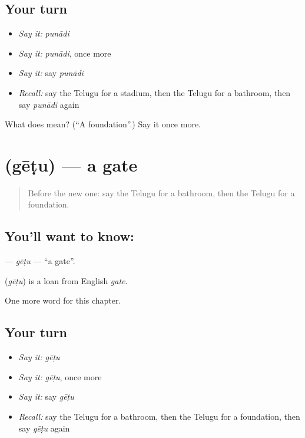 \subsection*{Your turn}
\begin{itemize}
\raggedright
  \item \emph{Say it:} \emph{punādi}
  \item \emph{Say it:} \emph{punādi}, once more
  \item \emph{Say it:} say \emph{punādi}
  \item \emph{Recall:} say the Telugu for a stadium, then the Telugu for a bathroom, then say \emph{punādi} again
\end{itemize}

\begin{tcolorbox}[breakable,colback=teal!4,colframe=teal!35!black,title={Before you move on}]
What does  mean? (\textquotedblleft{}A foundation\textquotedblright{}.) Say it once more.
\end{tcolorbox}
\section[\texorpdfstring{\te{గేటు} (gēṭu)}{గేటు (gēṭu)}]{ (gēṭu) — a gate}

\label{lesson:TE-C216-getu}



\begin{quote}
Before the new one: say the Telugu for a bathroom, then the Telugu for a foundation.
\end{quote}

\subsection*{You'll want to know: }
\textbf{} — \emph{gēṭu} — \textquotedblleft{}a gate\textquotedblright{}.

\begin{cousinweb}
\textbf{} (\emph{gēṭu}) is a loan from English \emph{gate}.
\end{cousinweb}

\begin{grammarlens}[title={What you've built}]
One more word for this chapter.
\end{grammarlens}

\subsection*{Your turn}
\begin{itemize}
\raggedright
  \item \emph{Say it:} \emph{gēṭu}
  \item \emph{Say it:} \emph{gēṭu}, once more
  \item \emph{Say it:} say \emph{gēṭu}
  \item \emph{Recall:} say the Telugu for a bathroom, then the Telugu for a foundation, then say \emph{gēṭu} again
\end{itemize}

